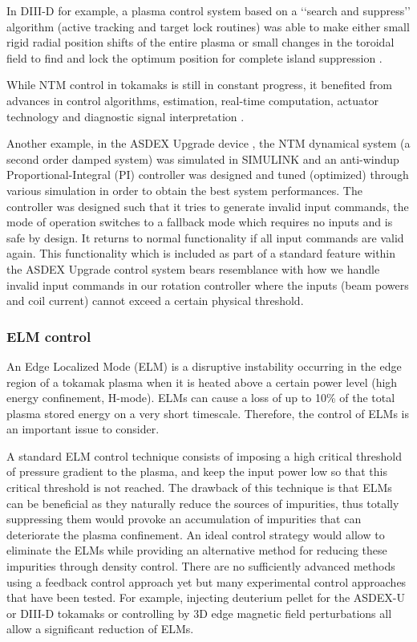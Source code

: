 \documentclass[12pt,lot, lof]{puthesis}
\begin{document}
In DIII-D for example, a plasma control system based on a ‘‘search and suppress’’ algorithm (active tracking and target lock routines) was able to make either small rigid radial position shifts of the entire plasma or small changes in the toroidal field to find and lock the optimum position for complete island suppression  \cite{Haye02}. 

While NTM control in tokamaks is still in constant progress, it benefited from advances in control algorithms, estimation, real-time computation, actuator technology and diagnostic signal interpretation \cite{Bongers09, Volpe09, Zohm07}.

Another example, in the ASDEX Upgrade device \cite{Rapson13, Rapson14}, the NTM dynamical system (a second order damped system) was simulated in SIMULINK and an anti-windup Proportional-Integral (PI) controller was designed and tuned (optimized) through various simulation in order to obtain the best system performances. 
The controller was designed such that it tries to generate invalid input commands, the mode of operation switches to a fallback mode which requires no inputs and is safe by design. It returns to normal functionality if all input commands are valid again. This functionality which is included as part of a standard feature within the ASDEX Upgrade control system bears resemblance with how we handle invalid input commands in our rotation controller where the inputs (beam powers and coil current) cannot exceed a certain physical threshold.

\subsubsection{ELM control}
An Edge Localized Mode (ELM) is a disruptive instability occurring in the edge region of a tokamak plasma when it is heated above a certain power level (high energy confinement, H-mode). ELMs can cause a loss of up to 10\% of the total plasma stored energy on a very short timescale. Therefore, the control of ELMs is an important issue to consider.

A standard ELM control technique consists of imposing a high critical threshold of pressure gradient to the plasma, and keep the input power low so that this critical threshold is not reached.
The drawback of this technique is that ELMs can be beneficial as they naturally reduce the sources of impurities, thus totally suppressing them would provoke an accumulation of impurities that can deteriorate the plasma confinement.
An ideal control strategy would allow to eliminate the ELMs while providing an alternative method for reducing these impurities through density control. There are no sufficiently advanced methods using a feedback control approach yet but many experimental control approaches that have been tested. For example, injecting deuterium pellet for the ASDEX-U or DIII-D tokamaks \cite{Kallenbach05, Loarte14} or controlling by 3D edge magnetic field perturbations \cite{ Loarte14} all allow a significant reduction of ELMs.
\end{document}
